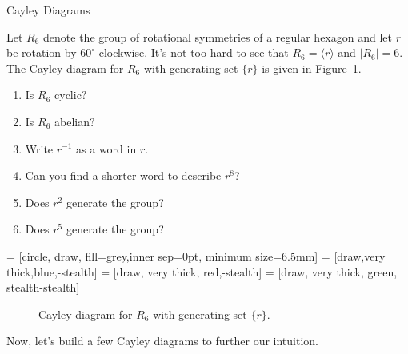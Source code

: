\begin{section}{Cayley Diagrams}
\begin{problem}\label{prob:introducing_R6}
Let $R_6$ denote the group of rotational symmetries of a regular hexagon and let $r$ be rotation by $60^{\circ}$ clockwise. It's not too hard to see that $R_6=\langle r\rangle$ and $|R_6|=6$.  The Cayley diagram for $R_6$ with generating set $\{r\}$ is given in Figure~\ref{fig:rotation6}. 
\begin{enumerate}[label=\textrm{(\alph*)}]
\item Is $R_6$ cyclic?
\item Is $R_6$ abelian?
\item Write $r^{-1}$ as a word in $r$.
\item Can you find a shorter word to describe $r^8$?
\item Does $r^2$ generate the group?
\item Does $r^5$ generate the group?
\end{enumerate}
\end{problem}

 = [circle, draw, fill=grey,inner sep=0pt, minimum size=6.5mm]
 = [draw,very thick,blue,-stealth]
 = [draw, very thick, red,-stealth]
 = [draw, very thick, green, stealth-stealth]

\begin{figure}[!ht]
\centering
{}
\caption{Cayley diagram for $R_6$ with generating set $\{r\}$.}
\label{fig:rotation6}
\end{figure}
 
Now, let's build a few Cayley diagrams to further our intuition.


\end{section}
